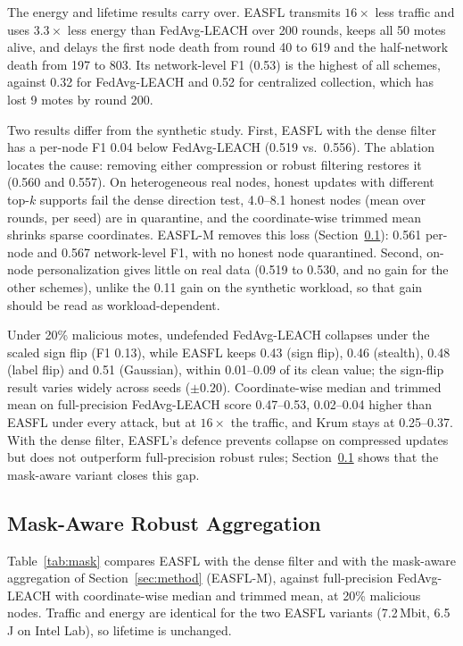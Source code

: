 \documentclass[journal]{IEEEtran}
\begin{document}
The energy and lifetime results carry over. EASFL transmits $16\times$ less traffic and uses $3.3\times$ less energy than FedAvg-LEACH over 200 rounds, keeps all 50 motes alive, and delays the first node death from round 40 to 619 and the half-network death from 197 to 803. Its network-level F1 (0.53) is the highest of all schemes, against 0.32 for FedAvg-LEACH and 0.52 for centralized collection, which has lost 9 motes by round 200.

Two results differ from the synthetic study. First, EASFL with the dense filter has a per-node F1 0.04 below FedAvg-LEACH (0.519 vs.\ 0.556). The ablation locates the cause: removing either compression or robust filtering restores it (0.560 and 0.557). On heterogeneous real nodes, honest updates with different top-$k$ supports fail the dense direction test, 4.0--8.1 honest nodes (mean over rounds, per seed) are in quarantine, and the coordinate-wise trimmed mean shrinks sparse coordinates. EASFL-M removes this loss (Section~\ref{sec:mask}): 0.561 per-node and 0.567 network-level F1, with no honest node quarantined. Second, on-node personalization gives little on real data (0.519 to 0.530, and no gain for the other schemes), unlike the 0.11 gain on the synthetic workload, so that gain should be read as workload-dependent.

Under 20\% malicious motes, undefended FedAvg-LEACH collapses under the scaled sign flip (F1 0.13), while EASFL keeps 0.43 (sign flip), 0.46 (stealth), 0.48 (label flip) and 0.51 (Gaussian), within 0.01--0.09 of its clean value; the sign-flip result varies widely across seeds ($\pm0.20$). Coordinate-wise median and trimmed mean on full-precision FedAvg-LEACH score 0.47--0.53, 0.02--0.04 higher than EASFL under every attack, but at $16\times$ the traffic, and Krum stays at 0.25--0.37. With the dense filter, EASFL's defence prevents collapse on compressed updates but does not outperform full-precision robust rules; Section~\ref{sec:mask} shows that the mask-aware variant closes this gap.

\subsection{Mask-Aware Robust Aggregation}\label{sec:mask}
Table~\ref{tab:mask} compares EASFL with the dense filter and with the mask-aware aggregation of Section~\ref{sec:method} (EASFL-M), against full-precision FedAvg-LEACH with coordinate-wise median and trimmed mean, at 20\% malicious nodes. Traffic and energy are identical for the two EASFL variants (7.2\,Mbit, 6.5\,J on Intel Lab), so lifetime is unchanged.
\end{document}

